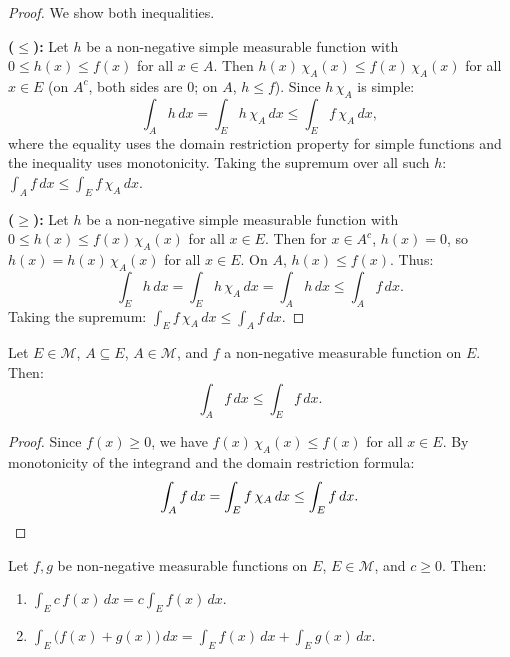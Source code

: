 \documentclass[11pt]{report}
\begin{document}
\begin{proof}
We show both inequalities.

\textbf{($\leq$):} Let $h$ be a non-negative simple measurable function with $0 \leq h(x) \leq f(x)$ for all $x \in A$. Then $h(x)\,\chi_A(x) \leq f(x)\,\chi_A(x)$ for all $x \in E$ (on $A^c$, both sides are $0$; on $A$, $h \leq f$). Since $h\,\chi_A$ is simple:
\[
\int_A h\,dx = \int_E h\,\chi_A\,dx \leq \int_E f\,\chi_A\,dx,
\]
where the equality uses the domain restriction property for simple functions and the inequality uses monotonicity. Taking the supremum over all such $h$: $\int_A f\,dx \leq \int_E f\,\chi_A\,dx$.

\textbf{($\geq$):} Let $h$ be a non-negative simple measurable function with $0 \leq h(x) \leq f(x)\,\chi_A(x)$ for all $x \in E$. Then for $x \in A^c$, $h(x) = 0$, so $h(x) = h(x)\,\chi_A(x)$ for all $x \in E$. On $A$, $h(x) \leq f(x)$. Thus:
\[
\int_E h\,dx = \int_E h\,\chi_A\,dx = \int_A h\,dx \leq \int_A f\,dx.
\]
Taking the supremum: $\int_E f\,\chi_A\,dx \leq \int_A f\,dx$.
\end{proof}

\begin{corbox}
Let $E \in \mathcal{M}$, $A \subseteq E$, $A \in \mathcal{M}$, and $f$ a non-negative measurable function on $E$. Then:
\[
\int_A f\,dx \leq \int_E f\,dx.
\]
\end{corbox}

\begin{proof}
Since $f(x) \geq 0$, we have $f(x)\,\chi_A(x) \leq f(x)$ for all $x \in E$. By monotonicity of the integrand and the domain restriction formula:
\[
\int_A f\,dx = \int_E f\,\chi_A\,dx \leq \int_E f\,dx. \qedhere
\]
\end{proof}

\begin{thmbox}
Let $f, g$ be non-negative measurable functions on $E$, $E \in \mathcal{M}$, and $c \geq 0$. Then:
\begin{enumerate}[label=(\roman*)]
\item $\displaystyle\int_E c\,f(x)\,dx = c\int_E f(x)\,dx$.
\item $\displaystyle\int_E \bigl(f(x) + g(x)\bigr)\,dx = \int_E f(x)\,dx + \int_E g(x)\,dx$.
\end{enumerate}
\end{thmbox}
\end{document}
